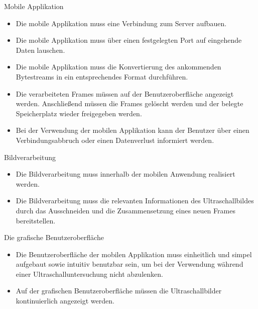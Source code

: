 \begin{minipage}{\textwidth}
Mobile Applikation
\begin{itemize}
\item Die mobile Applikation muss eine Verbindung zum Server aufbauen.
\item Die mobile Applikation muss über einen festgelegten Port auf eingehende Daten lauschen.
\item Die mobile Applikation muss die Konvertierung des ankommenden Bytestreams in ein entsprechendes Format durchführen.
\item Die verarbeiteten Frames müssen auf der Benutzeroberfläche angezeigt werden. Anschließend müssen die Frames gelöscht werden und der belegte Speicherplatz wieder freigegeben werden. 
\item Bei der Verwendung der mobilen Applikation kann der Benutzer über einen Verbindungsabbruch oder einen Datenverlust informiert werden.\\
\end{itemize}
\end{minipage}

\begin{minipage}{\textwidth}
Bildverarbeitung
\begin{itemize}
\item Die Bildverarbeitung muss innerhalb der mobilen Anwendung realisiert werden.
\item Die Bildverarbeitung muss die relevanten Informationen des Ultraschallbildes durch das Ausschneiden und die Zusammensetzung eines neuen Frames bereitstellen.\\
\end{itemize}
\end{minipage}

\begin{minipage}{\textwidth}
Die grafische Benutzeroberfläche
\begin{itemize}
\item Die Benutzeroberfläche der mobilen Applikation muss einheitlich und simpel aufgebaut sowie intuitiv benutzbar sein, um bei der Verwendung während einer Ultraschalluntersuchung nicht abzulenken.
\item Auf der grafischen Benutzeroberfläche müssen die Ultraschallbilder kontinuierlich angezeigt werden.
\end{itemize}
\end{minipage}
